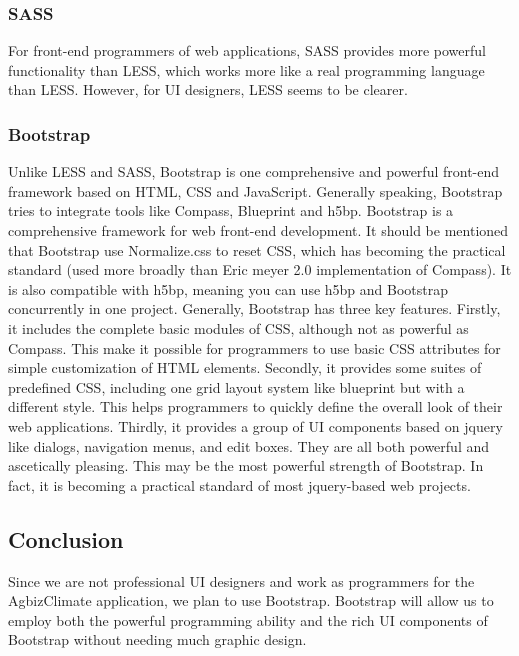 \documentclass[letterpaper,10pt]{article}
\begin{document}
		\subsubsection{SASS}
        For front-end programmers of web applications, SASS provides more powerful functionality than LESS, which works more like a real programming language than LESS. However, for UI designers, LESS seems to be clearer.

		\subsubsection{Bootstrap}
    Unlike LESS and SASS, Bootstrap is one comprehensive and powerful front-end framework based on HTML, CSS and JavaScript. Generally speaking, Bootstrap tries to integrate tools like Compass, Blueprint and h5bp. Bootstrap is a comprehensive framework for web front-end development. It should be mentioned that Bootstrap use Normalize.css to reset CSS, which has becoming the practical standard (used more broadly than Eric meyer 2.0 implementation of Compass). It is also compatible with h5bp, meaning you can use h5bp and Bootstrap concurrently in one project. Generally, Bootstrap has three key features. Firstly, it includes the complete basic modules of CSS, although not as powerful as Compass. This make it possible for programmers to use basic CSS attributes for simple customization of HTML elements. Secondly, it provides some suites of predefined CSS, including one grid layout system like blueprint but with a different style. This helps programmers to quickly define the overall look of their web applications. Thirdly, it provides a group of UI components based on jquery like dialogs, navigation menus, and edit boxes. They are all both powerful and ascetically pleasing. This may be the most powerful strength of Bootstrap. In fact, it is becoming a practical standard of most jquery-based web projects.

	\subsection{Conclusion}
      Since we are not professional UI designers and work as programmers for the AgbizClimate application, we plan to use Bootstrap. Bootstrap will allow us to employ both the powerful programming ability and the rich UI components of Bootstrap without needing much graphic design.
\end{document}
